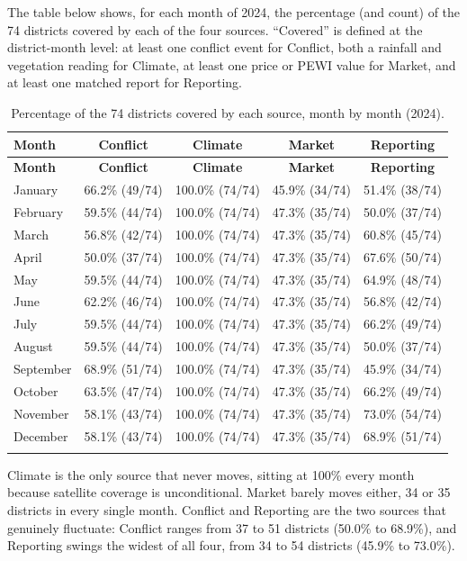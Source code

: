 \documentclass[12pt,a4paper]{article}
\begin{document}
The table below shows, for each month of 2024, the percentage (and count) of the 74 districts covered by each of the four sources. ``Covered'' is defined at the district-month level: at least one conflict event for Conflict, both a rainfall and vegetation reading for Climate, at least one price or PEWI value for Market, and at least one matched report for Reporting.

\begin{longtable}{lcccc}
\toprule
\textbf{Month} & \textbf{Conflict} & \textbf{Climate} & \textbf{Market} & \textbf{Reporting} \\
\midrule
\endfirsthead
\toprule
\textbf{Month} & \textbf{Conflict} & \textbf{Climate} & \textbf{Market} & \textbf{Reporting} \\
\midrule
\endhead
January & 66.2\% (49/74) & 100.0\% (74/74) & 45.9\% (34/74) & 51.4\% (38/74) \\
February & 59.5\% (44/74) & 100.0\% (74/74) & 47.3\% (35/74) & 50.0\% (37/74) \\
March & 56.8\% (42/74) & 100.0\% (74/74) & 47.3\% (35/74) & 60.8\% (45/74) \\
April & 50.0\% (37/74) & 100.0\% (74/74) & 47.3\% (35/74) & 67.6\% (50/74) \\
May & 59.5\% (44/74) & 100.0\% (74/74) & 47.3\% (35/74) & 64.9\% (48/74) \\
June & 62.2\% (46/74) & 100.0\% (74/74) & 47.3\% (35/74) & 56.8\% (42/74) \\
July & 59.5\% (44/74) & 100.0\% (74/74) & 47.3\% (35/74) & 66.2\% (49/74) \\
August & 59.5\% (44/74) & 100.0\% (74/74) & 47.3\% (35/74) & 50.0\% (37/74) \\
September & 68.9\% (51/74) & 100.0\% (74/74) & 47.3\% (35/74) & 45.9\% (34/74) \\
October & 63.5\% (47/74) & 100.0\% (74/74) & 47.3\% (35/74) & 66.2\% (49/74) \\
November & 58.1\% (43/74) & 100.0\% (74/74) & 47.3\% (35/74) & 73.0\% (54/74) \\
December & 58.1\% (43/74) & 100.0\% (74/74) & 47.3\% (35/74) & 68.9\% (51/74) \\
\bottomrule
\caption{Percentage of the 74 districts covered by each source, month by month (2024).} \label{tab:appC} \\
\end{longtable}

\noindent Climate is the only source that never moves, sitting at 100\% every month because satellite coverage is unconditional. Market barely moves either, 34 or 35 districts in every single month. Conflict and Reporting are the two sources that genuinely fluctuate: Conflict ranges from 37 to 51 districts (50.0\% to 68.9\%), and Reporting swings the widest of all four, from 34 to 54 districts (45.9\% to 73.0\%).
\end{document}
